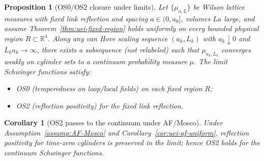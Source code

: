 \documentclass[11pt]{amsart}
\theoremstyle{plain}
\newtheorem{proposition}[theorem]{Proposition}
\newtheorem{corollary}[theorem]{Corollary}
\theoremstyle{definition}
\theoremstyle{remark}
\begin{document}
\medskip
\begin{proposition}[OS0/OS2 closure under limits]\label{prop:os0os2-closure}
Let $\{\mu_{a,L}\}$ be Wilson lattice measures with fixed link reflection and spacing $a\in(0,a_0]$, volumes $L a$ large, and assume Theorem~\ref{thm:uei-fixed-region} holds uniformly on every bounded physical region $R\subset\mathbb R^4$. Along any van Hove scaling sequence $(a_k,L_k)$ with $a_k\downarrow 0$ and $L_k a_k\to\infty$, there exists a subsequence (not relabeled) such that $\mu_{a_k,L_k}$ converges weakly on cylinder sets to a continuum probability measure $\mu$. The limit Schwinger functions satisfy:
\begin{itemize}
  \item OS0 (temperedness on loop/local fields) on each fixed region $R$;
  \item OS2 (reflection positivity) for the fixed link reflection.
\end{itemize}
\end{proposition}

\begin{corollary}[OS2 passes to the continuum under AF/Mosco]\label{cor:os2-pass}
Under Assumption~\ref{assump:AF-Mosco} and Corollary~\ref{cor:uei-af-uniform}, reflection positivity for time-zero cylinders is preserved in the limit; hence OS2 holds for the continuum Schwinger functions.
\end{corollary}
\end{document}
